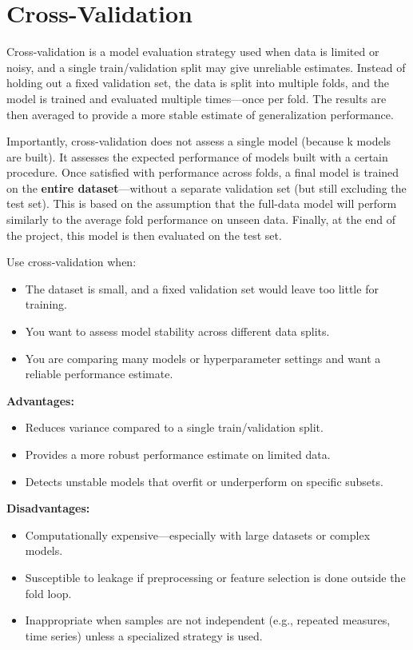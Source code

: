 \documentclass[12pt,openany]{book}
\begin{document}
\section{Cross-Validation}

Cross-validation is a model evaluation strategy used when data is limited or noisy, and a single train/validation split may give unreliable estimates. Instead of holding out a fixed validation set, the data is split into multiple folds, and the model is trained and evaluated multiple times—once per fold. The results are then averaged to provide a more stable estimate of generalization performance. 
\newline

Importantly, cross-validation does not assess a single model (because k models are built).
It assesses the expected performance of models built with a certain procedure. Once satisfied with performance across folds, a final model is trained on the \textbf{entire dataset}—without a separate validation set (but still excluding the test set). This is based on the assumption that the full-data model will perform similarly to the average fold performance on unseen data. Finally, at the end of the project, this model is then evaluated on the test set.
\newline

Use cross-validation when:
\begin{itemize}
    \item The dataset is small, and a fixed validation set would leave too little for training.
    \item You want to assess model stability across different data splits.
    \item You are comparing many models or hyperparameter settings and want a reliable performance estimate.
\end{itemize} 

\textbf{Advantages:}
\begin{itemize}
    \item Reduces variance compared to a single train/validation split.
    \item Provides a more robust performance estimate on limited data.
    \item Detects unstable models that overfit or underperform on specific subsets.
\end{itemize} 

\textbf{Disadvantages:}
\begin{itemize}
    \item Computationally expensive—especially with large datasets or complex models.
    \item Susceptible to leakage if preprocessing or feature selection is done outside the fold loop.
    \item Inappropriate when samples are not independent (e.g., repeated measures, time series) unless a specialized strategy is used.
\end{itemize} 
\end{document}
